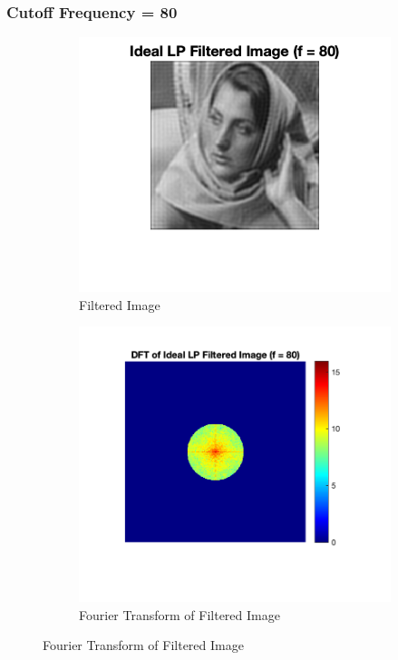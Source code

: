 \documentclass[12pt]{article}
\begin{document}
\subsubsection*{Cutoff Frequency = 80}
\begin{figure}[H]
    \begin{subfigure}{.45\textwidth}
    \centering
      \includegraphics[width=1\linewidth]{../images/barbara_ideal_LPF_80.png}
      \caption{Filtered Image}
    \end{subfigure}
    \begin{subfigure}{.5\textwidth}
    \centering
      \includegraphics[width=1\linewidth]{../images/barbara_DFT_ideal_LPF_80.png}
      \caption{Fourier Transform of Filtered Image}
    \end{subfigure}
\end{figure}
\end{document}
